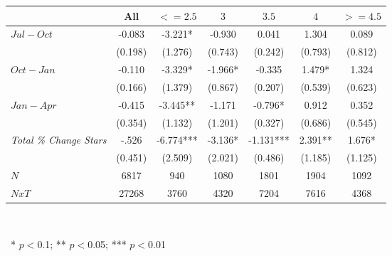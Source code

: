 \begin{center}
\begin{tabular}{lcccccc}
\hline  & All &  $ <=2.5 $  &  $ 3 $  &  $ 3.5 $  &  $ 4 $  &  $ >=4.5$ \\
\hline  $ Jul-Oct $  & -0.083 & -3.221* & -0.930 & 0.041 & 1.304 & 0.089\\
 & (0.198) & (1.276) & (0.743) & (0.242) & (0.793) & (0.812)\\
 $ Oct-Jan $  & -0.110 & -3.329* & -1.966* & -0.335 & 1.479* & 1.324\\
 & (0.166) & (1.379) & (0.867) & (0.207) & (0.539) & (0.623)\\
 $ Jan-Apr $  & -0.415 & -3.445** & -1.171 & -0.796* & 0.912 & 0.352\\
 & (0.354) & (1.132) & (1.201) & (0.327) & (0.686) & (0.545)\\
\hline \textit{Total \% Change Stars} & -.526 & -6.774*** & -3.136* & -1.131*** & 2.391** & 1.676*\\
  & (0.451) & (2.509) & (2.021) & (0.486) & (1.185) & (1.125)\\
\hline  $ N $  & 6817 & 940 & 1080 & 1801 & 1904 & 1092\\
 $ NxT $  & 27268 & 3760 & 4320 & 7204 & 7616 & 4368\\
\hline\end{tabular}\\
\begin{tiny}\ * $p<0$.1; ** $p<0$.05; *** $p<0$.01\end{tiny}\\
\end{center}
